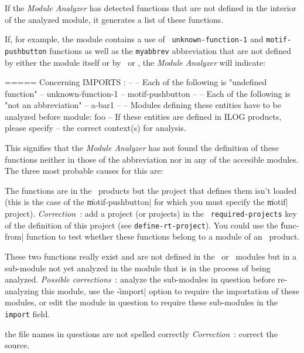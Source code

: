 
If the {\em Module Analyzer} has detected functions that are not defined in the interior of the analyzed module, it generates a list of these functions.

If, for example, the module contains a use of {\tt
unknown-function-1} and {\tt motif-pushbutton} functions as well as the {\tt myabbrev} abbreviation that are not defined by either the module itself or by \Aida\ or \LeLisp, the {\em Module Analyzer} will indicate:

\begin{Longcode*}
===== Concerning IMPORTS :
--
-- Each of the following is "undefined function"
--      unknown-function-1 
--      motif-pushbutton
--
-- Each of the following is "not an abbreviation"
--      a-bar1
--
-- Modules defining these entities have to be analyzed before module: foo
-- If these entities are defined in ILOG products, please specify
-- the correct context(s) for analysis.

\end{Longcode*}

This signifies that the {\em Module Analyzer} has not found the definition of these functions neither in those of the abbreviation nor in any of the accesible modules.  The three most probable causes for this are: 

\begin {Itemize}

\item The functions are in the \Ilog \ products but the project that defines them isn't loaded (this is the case of the \|motif-pushbutton| for which you must specify the \|motif| project).  
{\it Correction}\ : add a project (or projects) in the {\tt
required-projects} key of the definition of this project (see {\tt define-rt-project}).
You could use the \|func-from| function to test whether these functions belong to a module of an \Ilog\  product.

\item These two functions really exist and are not defined in the \Aida\ or \LeLisp\ modules but in a sub-module not yet analyzed in the module that is in the process of being analyzed. 
{\it Possible corrections}\ : analyze the sub-modules in question before re-analyzing this module, 
use the \|-import| option to require the importation of these modules, or edit the module in question to require these sub-modules in the {\tt import} field. 

\item the file names in questions are not spelled correctly
{\it Correction}\ : correct the source.

\end {Itemize}

